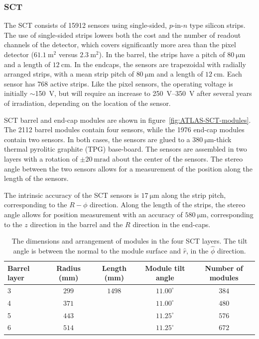 \subsubsection{SCT}\label{sec:ATLAS-id-sct}

The SCT consists of 15912 sensors using single-sided, $p$-in-$n$ type silicon strips. The use of single-sided strips lowers both the cost and the number of readout channels of the detector, which covers significantly more area than the pixel detector ($\SI{61.1}{\meter\tothe{2}}$ versus $\SI{2.3}{\meter\tothe{2}}$). In the barrel, the strips have a pitch of $\SI{80}{\micro\meter}$ and a length of $\SI{12}{\centi\meter}$. In the endcaps, the sensors are trapezoidal with radially arranged strips, with a mean strip pitch of $\SI{80}{\micro\meter}$ and a length of $\SI{12}{\centi\meter}$. Each sensor has 768 active strips. Like the pixel sensors, the operating voltage is initially $\sim$\SI{150}{\volt}, but will require an increase to \SIrange[range-phrase=-]{250}{350}{\volt} after several years of irradiation, depending on the location of the sensor. 

SCT barrel and end-cap modules are shown in figure~\ref{fig:ATLAS-SCT-modules}. The 2112 barrel modules contain four sensors, while the 1976 end-cap modules contain two sensors. In both cases, the sensors are glued to a $\SI{380}{\micro\meter}$-thick thermal pyrolitic graphite (TPG) base-board. The sensors are assembled in two layers with a rotation of $\pm\SI{20}{\milli\radian}$ about the center of the sensors. The stereo angle between the two sensors allows for a measurement of the position along the length of the sensors. 


The intrinsic accuracy of the SCT sensors is $\SI{17}{\micro\meter}$ along the strip pitch, corresponding to the $R-\phi$ direction. Along the length of the strips, the stereo angle allows for position measurement with an accuracy of $\SI{580}{\micro\meter}$, corresponding to the $z$ direction in the barrel and the $R$ direction in the end-caps.

\begin{table}[htbp]
	\centering
	\scriptsize
	\begin{tabular}{|l|c|c|c|c|}
		\hline
		\textbf{Barrel layer} & \textbf{Radius (mm)} & \textbf{Length (mm)} & \textbf{Module tilt angle} & \textbf{Number of modules} \\
		\hline
		3 & $299$ & $1498$ & $11.00^{\circ}$ & $384$ \\
		4 & $371$ & & $11.00^{\circ}$ & $480$ \\
		5 & $443$ & & $11.25^{\circ}$ & $576$ \\
		6 & $514$ & & $11.25^{\circ}$ & $672$ \\
		\hline
	\end{tabular}
	\caption{The dimensions and arrangement of modules in the four SCT layers. The tilt angle is between the normal to the module surface and $\hat{r}$, in the $\hat{\phi}$ direction.}
	\label{fig:ATLAS-SCT-layout}
\end{table}

